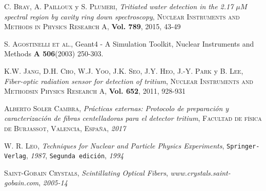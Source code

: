 \begin{thebibliography}{99}
 \textsc{C. Bray}, \textsc{A. Pailloux} y \textsc{S. Plumeri},
\textit{Tritiated water detection in the 2.17 $\mu M$ spectral region by cavity ring down spectroscopy}, \textsc{Nuclear Instruments and Methods in Physics Research A}, \textbf{Vol. 789}, \textsc{2015}, \textsc{43-49}

 {\textsc { S. Agostinelli et al.}, Geant4 - A Simulation Toolkit, Nuclear Instruments and Methods {\bf A 506}(2003) 250-303.}





 \textsc{K.W. Jang}, \textsc{D.H. Cho}, \textsc{W.J. Yoo}, \textsc{J.K. Seo}, \textsc{J.Y. Heo}, \textsc{J.-Y. Park} y \textsc{B. Lee},
\textit{Fiber-optic radiation sensor for detection of tritium}, \textsc{Nuclear Instruments and Methodsin Physics Research A}, \textbf{Vol. 652}, \textsc{2011}, \textsc{928-931}

 \textsc{Alberto Soler Cambra},
\textit{Prácticas externas: Protocolo de preparación y caracterización de fibras centelladoras para el detector tritium}, \textsc{Facultad de física de Burjassot, Valencia, España}, \textit{2017}

 \textsc{W. R. Leo},
\textit{Techniques for Nuclear and Particle Physics Experiments}, \texttt{Springer-Verlag}, \textit{1987}, \texttt{Segunda edición}, \textit{1994} 

 \textsc{Saint-Gobain Crystals},
\textit{Scintillating Optical Fibers}, \textit{www.crystals.saint-gobain.com}, \textit{2005-14}


\end{thebibliography}
